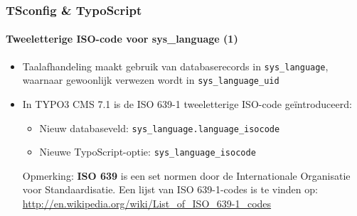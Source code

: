 
\begin{frame}[fragile]
	\frametitle{TSconfig \& TypoScript}
	\framesubtitle{Tweeletterige ISO-code voor sys\_language (1)}

	\begin{itemize}
		\item Taalafhandeling maakt gebruik van databaserecords in
			\texttt{sys\_language}, waarnaar gewoonlijk verwezen wordt in \texttt{sys\_language\_uid}
		\item In TYPO3 CMS 7.1 is de ISO 639-1 tweeletterige ISO-code geïntroduceerd:

			\begin{itemize}
				\item Nieuw databaseveld: \texttt{sys\_language.language\_isocode}
				\item Nieuwe TypoScript-optie: \texttt{sys\_language\_isocode}
			\end{itemize}


		\vspace{0.5cm}

		\small
			Opmerking: \textbf{ISO 639} is een set normen door de Internationale Organisatie voor Standaardisatie. 
			Een lijst van ISO 639-1-codes is te vinden op:\newline
			\url{http://en.wikipedia.org/wiki/List_of_ISO_639-1_codes}
		\normalsize

	\end{itemize}

\end{frame}


